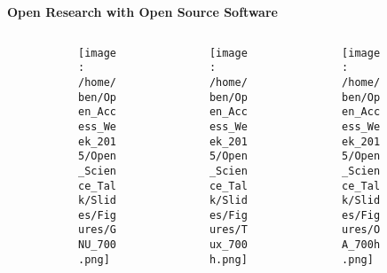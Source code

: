 \documentclass[xcolor=dvipsnames]{beamer}
\begin{document}





\begin{frame} %
\begin{center}
\textbf{\huge Open Research with Open Source Software}\\
\end{center}

\begin{figure}
\begin{columns}

\begin{column}{3.3cm}
\begin{center}
\begin{figure}
\texttt{[image: /home/ben/Open\_Access\_Week\_2015/Open\_Science\_Talk/Slides/Figures/GNU\_700.png]}
\end{figure}
\end{center}
\end{column} 

\begin{column}{3.3cm}
\begin{center}
\begin{figure}
\texttt{[image: /home/ben/Open\_Access\_Week\_2015/Open\_Science\_Talk/Slides/Figures/Tux\_700h.png]}
\end{figure}
\end{center}
\end{column} 

\begin{column}{3.3cm}
\begin{center}
\begin{figure}
\texttt{[image: /home/ben/Open\_Access\_Week\_2015/Open\_Science\_Talk/Slides/Figures/OA\_700h.png]}
\end{figure}
\end{center}
\end{column} 


\end{columns}
\end{figure}
\end{frame}
\end{document}
